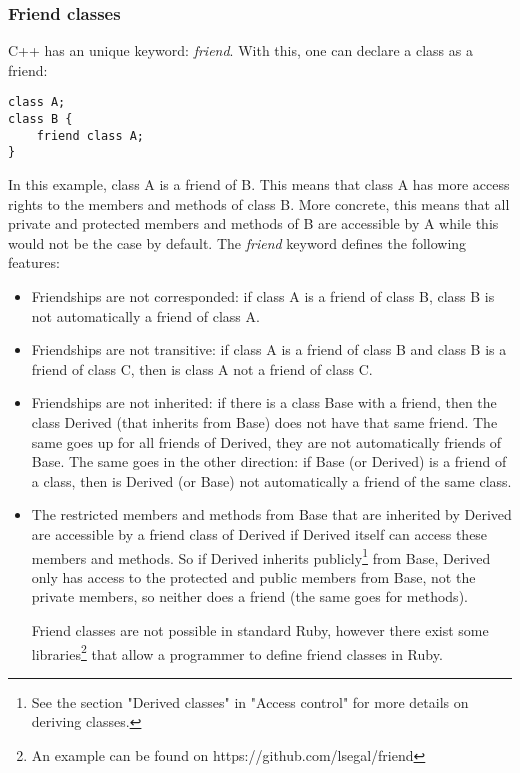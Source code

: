\documentclass[10pt,a4paper,twocolumn]{article}
\begin{document}
\subsubsection{Friend classes}
C++ has an unique keyword: \textit{friend}. With this, one can declare a class as a friend:

\begin{lstlisting}
class A;
class B {
	friend class A;
}
\end{lstlisting}

In this example, class A is a friend of B. This means that class A has more access rights to the members and methods of class B. More concrete, this means that all private and protected members and methods of B are accessible by A while this would not be the case by default. The \textit{friend} keyword defines the following features:

\begin{itemize}
\item Friendships are not corresponded: if class A is a friend of class B, class B is not automatically a friend of class A.
\item Friendships are not transitive: if class A is a friend of class B and class B is a friend of class C, then is class A not a friend of class C.
\item Friendships are not inherited: if there is a class Base with a friend, then the class Derived (that inherits from Base) does not have that same friend. The same goes up for all friends of Derived, they are not automatically friends of Base. The same goes in the other direction: if Base (or Derived) is a friend of a class, then is Derived (or Base) not automatically a friend of the same class.
\item The restricted members and methods from Base that are inherited by Derived are accessible by a friend class of Derived if Derived itself can access these members and methods. So if Derived inherits publicly\footnote{See the section "Derived classes" in "Access control" for more details on deriving classes.} from Base, Derived only has access to the protected and public members from Base, not the private members, so neither does a friend (the same goes for methods).

Friend classes are not possible in standard Ruby, however there exist some libraries\footnote{An example can be found on https://github.com/lsegal/friend} that allow a programmer to define friend classes in Ruby.
\end{itemize}
\end{document}
